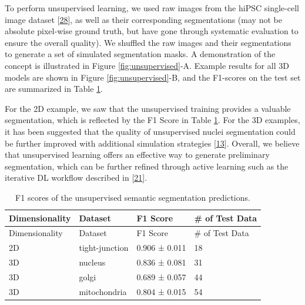 To perform unsupervised learning, we used raw images from the hiPSC single-cell image dataset {[}\protect\hyperlink{ref-5sGcmDuy}{28}{]}, as well as their corresponding segmentations (may not be absolute pixel-wise ground truth, but have gone through systematic evaluation to ensure the overall quality). We shuffled the raw images and their segmentations to generate a set of simulated segmentation masks. A demonstration of the concept is illustrated in Figure \ref{fig:unsupervised}-A. Example results for all 3D models are shown in Figure \ref{fig:unsupervised}-B, and the F1-scores on the test set are summarized in Table \ref{tbl:unsuper}.

For the 2D example, we saw that the unsupervised training provides a valuable segmentation, which is reflected by the F1 Score in Table \ref{tbl:unsuper}. For the 3D examples, it has been suggested that the quality of unsupervised nuclei segmentation could be further improved with additional simulation strategies {[}\protect\hyperlink{ref-RuFP3CS3}{13}{]}. Overall, we believe that unsupervised learning offers an effective way to generate preliminary segmentation, which can be further refined through active learning such as the iterative DL workflow described in {[}\protect\hyperlink{ref-jM3v1UjQ}{21}{]}.

\begin{longtable}[]{@{}llll@{}}
\caption{F1 scores of the unsupervised semantic segmentation predictions. \label{tbl:unsuper}}\label{tbl:unsuper}\tabularnewline
\toprule()
Dimensionality & Dataset & F1 Score & \# of Test Data \\
\midrule()
\endfirsthead
\toprule()
Dimensionality & Dataset & F1 Score & \# of Test Data \\
\midrule()
\endhead
2D & tight-junction & 0.906 ± 0.011 & 18 \\
3D & nucleus & 0.836 ± 0.081 & 31 \\
3D & golgi & 0.689 ± 0.057 & 44 \\
3D & mitochondria & 0.804 ± 0.015 & 54 \\
\bottomrule()
\end{longtable}

